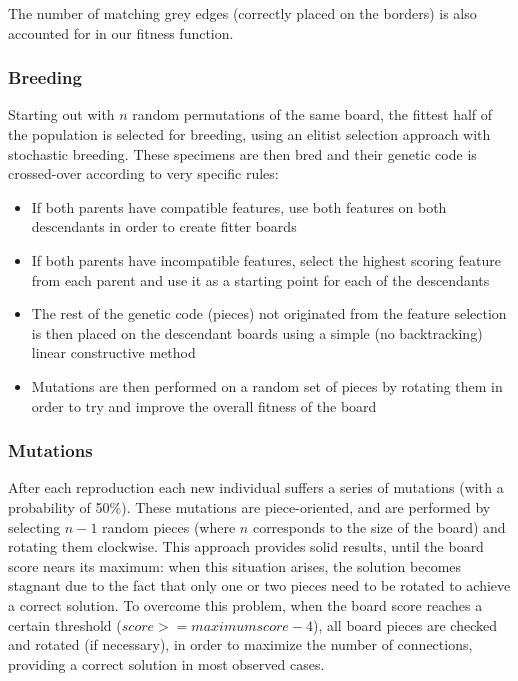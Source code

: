 \documentclass{llncs}
\begin{document}
The number of matching grey edges (correctly placed on the borders) is also accounted for in our fitness function.

\subsubsection{Breeding}

Starting out with $n$ random permutations of the same board, the fittest half of the population is selected for breeding, using an elitist selection approach with stochastic breeding. These specimens are then bred and their genetic code is crossed-over according to very specific rules:

\begin{itemize}
  \item If both parents have compatible features, use both features on both descendants in order to create fitter boards
  \item If both parents have incompatible features, select the highest scoring feature from each parent and use it as a starting point for each of the descendants
  \item The rest of the genetic code (pieces) not originated from the feature selection is then placed on the descendant boards using a simple (no backtracking) linear constructive method
  \item Mutations are then performed on a random set of pieces by rotating them in order to try and improve the overall fitness of the board
\end{itemize}

\subsubsection{Mutations}\label{sec:mutations}

After each reproduction each new individual suffers a series of mutations (with a probability of 50\%). These mutations are piece-oriented, and are performed by selecting $n-1$ random pieces (where $n$ corresponds to the size of the board) and rotating them clockwise. This approach provides solid results, until the board score nears its maximum: when this situation arises, the solution becomes stagnant due to the fact that only one or two pieces need to be rotated to achieve a correct solution. To overcome this problem, when the board score reaches a certain threshold ($score >= maximum score - 4$), all board pieces are checked and rotated (if necessary), in order to maximize the number of connections, providing a correct solution in most observed cases.
\end{document}
